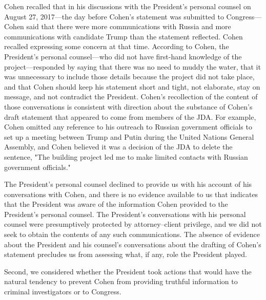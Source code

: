 {Cohen recalled that in his discussions with the President's personal counsel on August 27, 2017---the day before Cohen's statement was submitted to Congress---Cohen said that there were more communications with Russia and more communications with candidate Trump than the statement reflected.
Cohen recalled expressing some concern at that time.
According to Cohen, the President's personal counsel---who did not have first-hand knowledge of the project---responded by saying that there was no need to muddy the water, that it was unnecessary to include those details because the project did not take place, and that Cohen should keep his statement short and tight, not elaborate, stay on message, and not contradict the President.
Cohen's recollection of the content of those conversations is consistent with direction about the substance of Cohen's draft statement that appeared to come from members of the JDA\null.
For example, Cohen omitted any reference to his outreach to Russian government officials to set up a meeting between Trump and Putin during the United Nations General Assembly, and Cohen believed it was a decision of the JDA to delete the sentence, "The building project led me to make limited contacts with Russian government officials."

The President's personal counsel declined to provide us with his account of his conversations with Cohen, and there is no evidence available to us that indicates that the President was aware of the information Cohen provided to the President's personal counsel.
The President's conversations with his personal counsel were presumptively protected by attorney--client privilege, and we did not seek to obtain the contents of any such communications.
The absence of evidence about the President and his counsel's conversations about the drafting of Cohen's statement precludes us from assessing what, if any, role the President played.

Second, we considered whether the President took actions that would have the natural tendency to prevent Cohen from providing truthful information to criminal investigators or to Congress.

}
